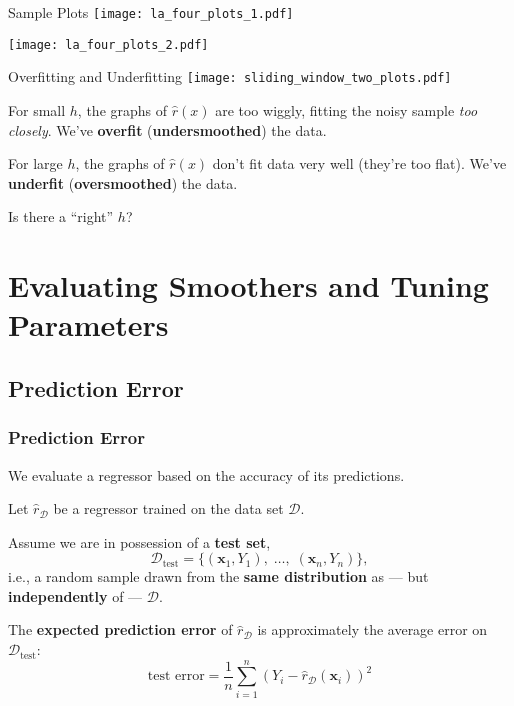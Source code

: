 \documentclass[xcolor={dvipsnames}]{beamer}
\renewcommand{\hat}{\widehat}
\newcommand{\cD}{\mathcal{D}}
\newcommand{\vx}{\mathbf{x}}
\newcommand{\test}{{\text{test}}}
\begin{document}
\begin{frame}{Sample Plots}%
    \texttt{[image: la\_four\_plots\_1.pdf]}
\end{frame}

\begin{frame}{}%
    \texttt{[image: la\_four\_plots\_2.pdf]}
\end{frame}

\begin{frame}{Overfitting and Underfitting}
    \setlength\parskip{1em}
    \texttt{[image: sliding\_window\_two\_plots.pdf]}

    For small $h$, the graphs of $\hat r(x)$ are too wiggly,
    fitting the noisy sample \emph{too closely}.
    We've \textbf{overfit} (\textbf{undersmoothed}) the data.


    For large $h$, the graphs of $\hat{r}(x)$ don't fit data very well (they're too flat).
    We've \textbf{underfit} (\textbf{oversmoothed}) the data.

    Is there a ``right'' $h$?
\end{frame}



\section{Evaluating Smoothers and Tuning Parameters}

\subsection{Prediction Error}
\begin{frame}
    \frametitle{Prediction Error}
    \setlength\parskip{0.75em}

    We evaluate a regressor based on the accuracy of its predictions.

    Let $\hat r_\cD$ be a regressor trained on the data set $\cD$.

    Assume we are in possession of a \textbf{test set},
    $$\cD_\test=\{(\vx_1,Y_1),\;\ldots,\;(\vx_n, Y_n)\},$$
    i.e., a random sample drawn from the \textbf{same distribution} as --- but \textbf{independently} of --- $\cD$.

    The \textbf{expected prediction error} of $\hat r_\cD$ is approximately the average error on $\cD_\test$:
    \[
        \text{test error} = \frac1n\sum_{i=1}^n (Y_i - \hat r_\cD(\vx_i))^2
    \]
\end{frame}
\end{document}
